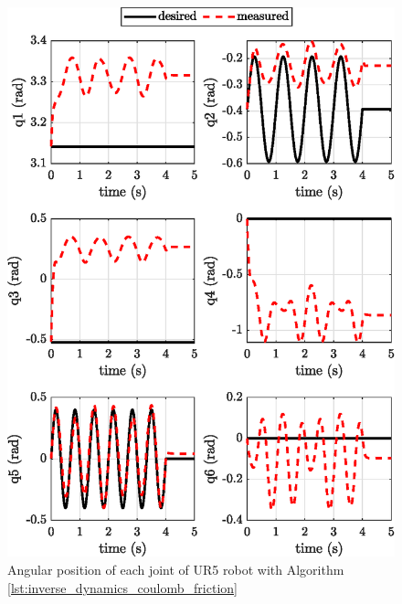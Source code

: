 \begin{figure}[H]
    \centering
    \includegraphics{images/act_2.8_mu_0.8/joint_position.eps}
    \caption{Angular position of each joint of UR5 robot with Algorithm \ref{lst:inverse_dynamics_coulomb_friction}}
    \label{fig:act_2.8_mu_0.8_joint_position}
\end{figure}
